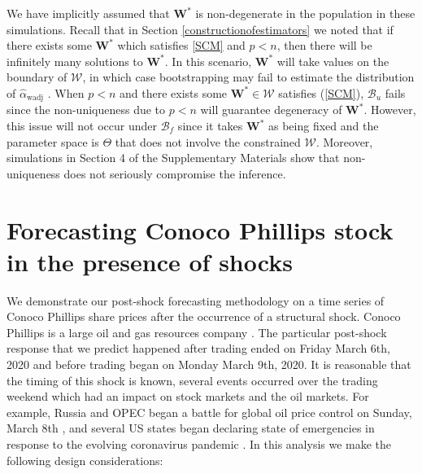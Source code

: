\documentclass[11pt]{article}
\def\mbf#1{\mathbf{#1}} %
\def\mrm#1{\mathrm{#1}} %
\def\mc#1{\mathcal{#1}} %
\theoremstyle{definition}
\begin{document}
 
We have implicitly assumed that $\mathbf{W}^*$ is non-degenerate in the population in these simulations.  Recall that in Section \ref{constructionofestimators} we noted that if there exists some $\mathbf{W}^*$ which satisfies \eqref{SCM} and $p < n$, then there will be infinitely many solutions to $\mathbf{W}^*$. In this scenario, $\mathbf{W}^*$ will take values on the boundary of $\mc{W}$, in which case bootstrapping may fail to estimate the distribution of $\hat{\alpha}_{\mrm{wadj}}$ \citep{andrews2000inconsistency}.  When $p < n$ and there exists some $\mathbf{W}^*\in \mc{W}$ satisfies (\ref{SCM}), $\mc{B}_u$ fails since the non-uniqueness due to $p < n$ will guarantee degeneracy of  $\mathbf{W}^*$. However, this issue will not occur under $\mc{B}_f$ since it takes $\mbf{W}^*$ as being fixed and the parameter space is $\Theta$ that does not involve the constrained $\mc{W}$. Moreover, simulations in Section 4 of the Supplementary Materials show that non-uniqueness does not seriously compromise the inference. 







\section{Forecasting Conoco Phillips stock in the presence of shocks}
\label{forecasting}

We demonstrate our post-shock forecasting methodology on a time series of Conoco Phillips share prices after the occurrence of a structural shock. Conoco Phillips is a large oil and gas resources company \citep{conocowhatwedo}. The particular post-shock response that we predict happened after trading ended on Friday March 6th, 2020 and before trading began on Monday March 9th, 2020. It is reasonable that the timing of this shock is known, several events occurred over the trading weekend which had an impact on stock markets and the oil markets. For example, Russia and OPEC began a battle for global oil price control on Sunday, March 8th \citep{sukhankin2020russian}, and several US states began declaring state of emergencies in response to the evolving coronavirus pandemic \citep{nygov, alonso2020state}. In this analysis we make the following design considerations:


\end{document}
